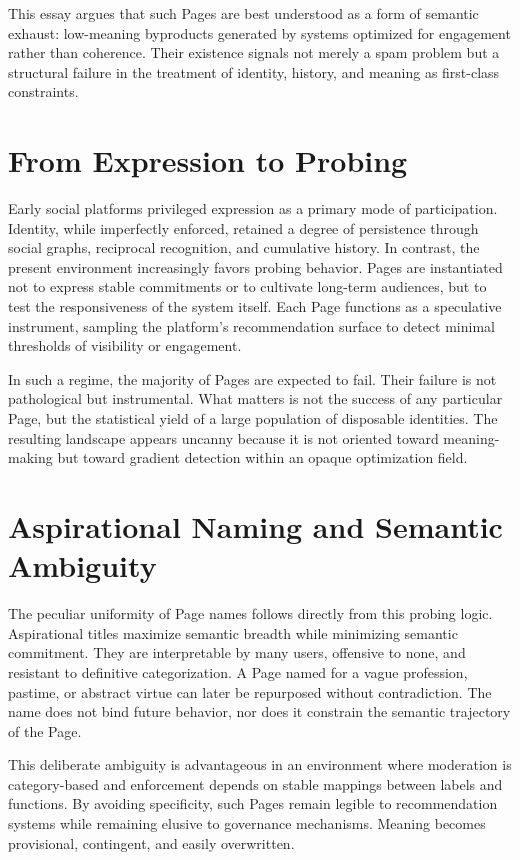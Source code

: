 \documentclass[11pt,oneside]{article}
\begin{document}
This essay argues that such Pages are best understood as a form of semantic exhaust: low-meaning byproducts generated by systems optimized for engagement rather than coherence. Their existence signals not merely a spam problem but a structural failure in the treatment of identity, history, and meaning as first-class constraints.

\section{From Expression to Probing}

Early social platforms privileged expression as a primary mode of participation. Identity, while imperfectly enforced, retained a degree of persistence through social graphs, reciprocal recognition, and cumulative history. In contrast, the present environment increasingly favors probing behavior. Pages are instantiated not to express stable commitments or to cultivate long-term audiences, but to test the responsiveness of the system itself. Each Page functions as a speculative instrument, sampling the platform’s recommendation surface to detect minimal thresholds of visibility or engagement.

In such a regime, the majority of Pages are expected to fail. Their failure is not pathological but instrumental. What matters is not the success of any particular Page, but the statistical yield of a large population of disposable identities. The resulting landscape appears uncanny because it is not oriented toward meaning-making but toward gradient detection within an opaque optimization field.

\section{Aspirational Naming and Semantic Ambiguity}

The peculiar uniformity of Page names follows directly from this probing logic. Aspirational titles maximize semantic breadth while minimizing semantic commitment. They are interpretable by many users, offensive to none, and resistant to definitive categorization. A Page named for a vague profession, pastime, or abstract virtue can later be repurposed without contradiction. The name does not bind future behavior, nor does it constrain the semantic trajectory of the Page.

This deliberate ambiguity is advantageous in an environment where moderation is category-based and enforcement depends on stable mappings between labels and functions. By avoiding specificity, such Pages remain legible to recommendation systems while remaining elusive to governance mechanisms. Meaning becomes provisional, contingent, and easily overwritten.
\end{document}
